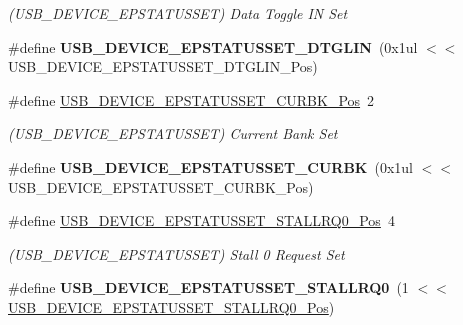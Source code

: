 \begin{DoxyCompactItemize}
\begin{DoxyCompactList}\small\item\em (U\+S\+B\+\_\+\+D\+E\+V\+I\+C\+E\+\_\+\+E\+P\+S\+T\+A\+T\+U\+S\+S\+E\+T) Data Toggle I\+N Set \end{DoxyCompactList}\item 
\hypertarget{group___s_a_m_l21___u_s_b_ga21c0d2e633708592743e13aca66d57a9}{}\#define {\bfseries U\+S\+B\+\_\+\+D\+E\+V\+I\+C\+E\+\_\+\+E\+P\+S\+T\+A\+T\+U\+S\+S\+E\+T\+\_\+\+D\+T\+G\+L\+I\+N}~(0x1ul $<$$<$ U\+S\+B\+\_\+\+D\+E\+V\+I\+C\+E\+\_\+\+E\+P\+S\+T\+A\+T\+U\+S\+S\+E\+T\+\_\+\+D\+T\+G\+L\+I\+N\+\_\+\+Pos)\label{group___s_a_m_l21___u_s_b_ga21c0d2e633708592743e13aca66d57a9}

\item 
\hypertarget{group___s_a_m_l21___u_s_b_ga7277cf7752b5e8de85e889dc20c44f8a}{}\#define \hyperlink{group___s_a_m_l21___u_s_b_ga7277cf7752b5e8de85e889dc20c44f8a}{U\+S\+B\+\_\+\+D\+E\+V\+I\+C\+E\+\_\+\+E\+P\+S\+T\+A\+T\+U\+S\+S\+E\+T\+\_\+\+C\+U\+R\+B\+K\+\_\+\+Pos}~2\label{group___s_a_m_l21___u_s_b_ga7277cf7752b5e8de85e889dc20c44f8a}

\begin{DoxyCompactList}\small\item\em (U\+S\+B\+\_\+\+D\+E\+V\+I\+C\+E\+\_\+\+E\+P\+S\+T\+A\+T\+U\+S\+S\+E\+T) Current Bank Set \end{DoxyCompactList}\item 
\hypertarget{group___s_a_m_l21___u_s_b_ga5844ed6e7e82dd1370a197c5253f050f}{}\#define {\bfseries U\+S\+B\+\_\+\+D\+E\+V\+I\+C\+E\+\_\+\+E\+P\+S\+T\+A\+T\+U\+S\+S\+E\+T\+\_\+\+C\+U\+R\+B\+K}~(0x1ul $<$$<$ U\+S\+B\+\_\+\+D\+E\+V\+I\+C\+E\+\_\+\+E\+P\+S\+T\+A\+T\+U\+S\+S\+E\+T\+\_\+\+C\+U\+R\+B\+K\+\_\+\+Pos)\label{group___s_a_m_l21___u_s_b_ga5844ed6e7e82dd1370a197c5253f050f}

\item 
\hypertarget{group___s_a_m_l21___u_s_b_ga16651f2eab2a1cc3465bcc3d9844152d}{}\#define \hyperlink{group___s_a_m_l21___u_s_b_ga16651f2eab2a1cc3465bcc3d9844152d}{U\+S\+B\+\_\+\+D\+E\+V\+I\+C\+E\+\_\+\+E\+P\+S\+T\+A\+T\+U\+S\+S\+E\+T\+\_\+\+S\+T\+A\+L\+L\+R\+Q0\+\_\+\+Pos}~4\label{group___s_a_m_l21___u_s_b_ga16651f2eab2a1cc3465bcc3d9844152d}

\begin{DoxyCompactList}\small\item\em (U\+S\+B\+\_\+\+D\+E\+V\+I\+C\+E\+\_\+\+E\+P\+S\+T\+A\+T\+U\+S\+S\+E\+T) Stall 0 Request Set \end{DoxyCompactList}\item 
\hypertarget{group___s_a_m_l21___u_s_b_ga7017e1c7ef750745e07566c7fde92ae4}{}\#define {\bfseries U\+S\+B\+\_\+\+D\+E\+V\+I\+C\+E\+\_\+\+E\+P\+S\+T\+A\+T\+U\+S\+S\+E\+T\+\_\+\+S\+T\+A\+L\+L\+R\+Q0}~(1 $<$$<$ \hyperlink{group___s_a_m_l21___u_s_b_ga16651f2eab2a1cc3465bcc3d9844152d}{U\+S\+B\+\_\+\+D\+E\+V\+I\+C\+E\+\_\+\+E\+P\+S\+T\+A\+T\+U\+S\+S\+E\+T\+\_\+\+S\+T\+A\+L\+L\+R\+Q0\+\_\+\+Pos})\label{group___s_a_m_l21___u_s_b_ga7017e1c7ef750745e07566c7fde92ae4}


\end{DoxyCompactItemize}

